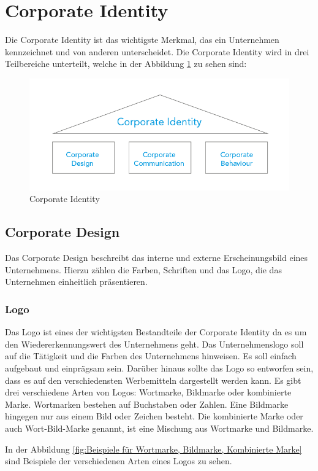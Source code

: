\section{Corporate Identity}
Die Corporate Identity ist das wichtigste Merkmal, das ein Unternehmen kennzeichnet und von anderen unterscheidet. Die Corporate Identity wird in drei Teilbereiche unterteilt, welche in der Abbildung \ref{fig:CorporateIdentity} zu sehen sind:

\begin{figure}[H]
	\centering
	\includegraphics[width=0.5\linewidth]{images/CorporateIdentity.png}
	\caption[Corporate Identity]{Corporate Identity}
	\label{fig:CorporateIdentity}
\end{figure}

\subsection{Corporate Design}
Das Corporate Design beschreibt das interne und externe Erscheinungsbild eines Unternehmens. Hierzu zählen die Farben, Schriften und das Logo, die das Unternehmen einheitlich präsentieren. \parencite{CorporateIdentity}

\newpage
\subsubsection{Logo}
Das Logo ist eines der wichtigsten Bestandteile der Corporate Identity da es um den Wiedererkennungswert des Unternehmens geht. Das Unternehmenslogo soll auf die Tätigkeit und die Farben des Unternehmens hinweisen. Es soll einfach aufgebaut  und einprägsam sein. Darüber hinaus sollte das Logo so entworfen sein, dass es auf den verschiedensten Werbemitteln dargestellt werden kann. Es gibt drei verschiedene Arten von Logos: Wortmarke, Bildmarke oder kombinierte Marke. Wortmarken bestehen auf Buchstaben oder Zahlen. Eine Bildmarke hingegen nur aus einem Bild oder Zeichen besteht. Die kombinierte Marke oder auch Wort-Bild-Marke genannt, ist eine Mischung aus Wortmarke und Bildmarke. \parencite{Firmenlogo} 

In der Abbildung \ref{fig:Beispiele für Wortmarke, Bildmarke, Kombinierte Marke} sind Beispiele der verschiedenen Arten eines Logos zu sehen.


